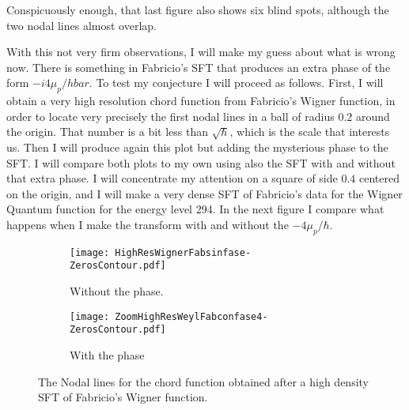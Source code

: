 \documentclass[a4paper,12pt]{article}
\begin{document}
Conspicuously enough, that last figure also shows six blind spots, although the
two nodal lines almost overlap. 

With this not very firm observations, I will make my guess about what is wrong now.
 There is something in Fabricio's SFT that produces an extra phase of the
form $ - i 4 \mu_p/hbar$.  
To test my conjecture I will proceed as follows.  First, I will obtain a very high
resolution chord function from Fabricio's Wigner function, in order to locate very
precisely the first nodal lines in a ball of radius $0.2$ around the origin.
That number is a bit less than $\sqrt{\hbar}$, which is the scale that interests
us.  Then I will produce again this plot  but adding the mysterious phase to 
the SFT. I will compare both plots to my own using also the SFT with and without
that extra phase. I will concentrate my attention on a square of side $0.4$
centered on the origin, and I will make a very dense SFT of Fabricio's data
for the Wigner Quantum function for the energy level 294. In the next figure 
I compare what happens when I make the transform with and without the
$-4 \mu_p /\hbar $. 



\begin{figure}[H]
  \centering
  \begin{subfigure}[b]{0.45\textwidth}
    \centering
          \texttt{[image: HighResWignerFabsinfase-ZerosContour.pdf]}
          \caption{Without the phase.}
                \label{WeylFabsinfase}
  \end{subfigure}%
\begin{subfigure}[b]{0.45\textwidth}
    \centering
          \texttt{[image: ZoomHighResWeylFabconfase4-ZerosContour.pdf]}
                \caption{With the phase}
                \label{WeylFabconfase}
  \end{subfigure}%
\caption{The Nodal lines for the chord function obtained after a high density SFT of Fabricio's
Wigner function.}
\label{FabNodalfases}
\end{figure}
\end{document}

